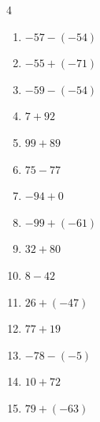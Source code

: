 \begin{multicols}{4}
\begin{enumerate}
        \phantom{$=8$}

  \item $-57-(-54)$

        \phantom{$=-3$}

\columnbreak %

\resetques

  \item $-55+(-71)$

        \phantom{$=-126$}

  \item $-59-(-54)$

        \phantom{$=-5$}

  \item $7+92$

        \phantom{$=99$}

  \item $99+89$

        \phantom{$=188$}

  \item $75-77$

        \phantom{$=-2$}

  \item $-94+0$

        \phantom{$=-94$}

  \item $-99+(-61)$

        \phantom{$=-160$}

  \item $32+80$

        \phantom{$=112$}

  \item $8-42$

        \phantom{$=-34$}

  \item $26+(-47)$

        \phantom{$=-21$}

  \item $77+19$

        \phantom{$=96$}

  \item $-78-(-5)$

        \phantom{$=-73$}

  \item $10+72$

        \phantom{$=82$}

  \item $79+(-63)$

        \phantom{$=16$}


\end{enumerate}
\end{multicols}
